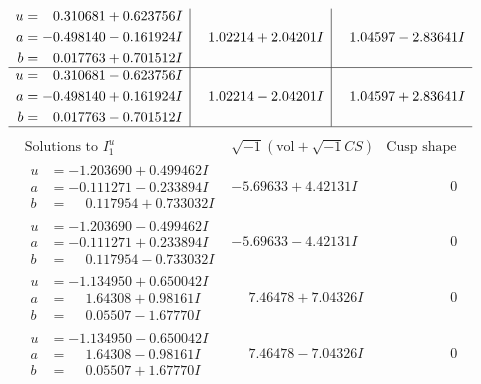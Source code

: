 \documentclass[1p]{elsarticle_modified}
\theoremstyle{definition}
\newcommand{\I}{\sqrt{-1}}
\begin{document}
$$\begin{array}{c|c|c}
\begin{aligned}
u &= \phantom{-}0.310681 + 0.623756 I \\
a &= -0.498140 - 0.161924 I \\
b &= \phantom{-}0.017763 + 0.701512 I\end{aligned}
 & \phantom{-}1.02214 + 2.04201 I & \phantom{-}1.04597 - 2.83641 I \\ \hline\begin{aligned}
u &= \phantom{-}0.310681 - 0.623756 I \\
a &= -0.498140 + 0.161924 I \\
b &= \phantom{-}0.017763 - 0.701512 I\end{aligned}
 & \phantom{-}1.02214 - 2.04201 I & \phantom{-}1.04597 + 2.83641 I\\
 \hline 
 \end{array}$$\newpage$$\begin{array}{c|c|c}  
\text{Solutions to }I^u_{1}& \I (\text{vol} + \sqrt{-1}CS) & \text{Cusp shape}\\
 \hline 
\begin{aligned}
u &= -1.203690 + 0.499462 I \\
a &= -0.111271 - 0.233894 I \\
b &= \phantom{-}0.117954 + 0.733032 I\end{aligned}
 & -5.69633 + 4.42131 I & \phantom{-0.000000 } 0 \\ \hline\begin{aligned}
u &= -1.203690 - 0.499462 I \\
a &= -0.111271 + 0.233894 I \\
b &= \phantom{-}0.117954 - 0.733032 I\end{aligned}
 & -5.69633 - 4.42131 I & \phantom{-0.000000 } 0 \\ \hline\begin{aligned}
u &= -1.134950 + 0.650042 I \\
a &= \phantom{-}1.64308 + 0.98161 I \\
b &= \phantom{-}0.05507 - 1.67770 I\end{aligned}
 & \phantom{-}7.46478 + 7.04326 I & \phantom{-0.000000 } 0 \\ \hline\begin{aligned}
u &= -1.134950 - 0.650042 I \\
a &= \phantom{-}1.64308 - 0.98161 I \\
b &= \phantom{-}0.05507 + 1.67770 I\end{aligned}
 & \phantom{-}7.46478 - 7.04326 I & \phantom{-0.000000 } 0 \\ \hline\begin{aligned}

\end{aligned}
\end{array}$$
\end{document}
